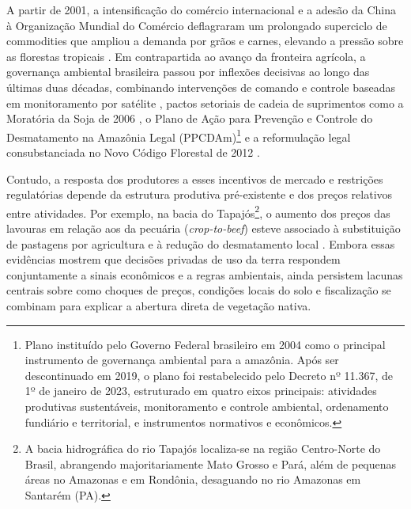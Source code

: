 A partir de 2001, a intensificação do comércio internacional e a adesão da China à Organização Mundial do Comércio deflagraram um prolongado superciclo de commodities que ampliou a demanda por grãos e carnes, elevando a pressão sobre as florestas tropicais \cite{BermanEtAl2023, fearnside2016china}. Em contrapartida ao avanço da fronteira agrícola, a governança ambiental brasileira passou por inflexões decisivas ao longo das últimas duas décadas, combinando intervenções de comando e controle baseadas em monitoramento por satélite \cite{AssuncaoEtAl2023}, pactos setoriais de cadeia de suprimentos como a Moratória da Soja de 2006 \cite{HardingEtAl2021, HeilmayrEtAl2020}, o Plano de Ação para Prevenção e Controle do Desmatamento na Amazônia Legal (PPCDAm)\footnote{Plano instituído pelo Governo Federal brasileiro em 2004 como o principal instrumento de governança ambiental para a amazônia. Após ser descontinuado em 2019, o plano foi restabelecido pelo Decreto nº 11.367, de 1º de janeiro de 2023, estruturado em quatro eixos principais: atividades produtivas sustentáveis, monitoramento e controle ambiental, ordenamento fundiário e territorial, e instrumentos normativos e econômicos.} e a reformulação legal consubstanciada no Novo Código Florestal de 2012 \cite{Brasil2012}. 

Contudo, a resposta dos produtores a esses incentivos de mercado e restrições regulatórias depende da estrutura produtiva pré-existente e dos preços relativos entre atividades. Por exemplo, na bacia do Tapajós\footnote{A bacia hidrográfica do rio Tapajós localiza-se na região Centro-Norte do Brasil, abrangendo majoritariamente Mato Grosso e Pará, além de pequenas áreas no Amazonas e em Rondônia, desaguando no rio Amazonas em Santarém (PA).}, o aumento dos preços das lavouras em relação aos da pecuária (\textit{crop-to-beef}) esteve associado à substituição de pastagens por agricultura e à redução do desmatamento local \cite{Braganca2018}. Embora essas evidências mostrem que decisões privadas de uso da terra respondem conjuntamente a sinais econômicos e a regras ambientais, ainda persistem lacunas centrais sobre como choques de preços, condições locais do solo e fiscalização se combinam para explicar a abertura direta de vegetação nativa.


